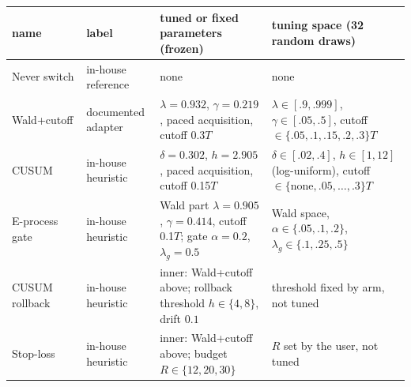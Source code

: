 \begin{tabular}{@{}>{\raggedright\arraybackslash}p{2.3cm}>{\raggedright\arraybackslash}p{3.2cm}>{\raggedright\arraybackslash}p{5.6cm}>{\raggedright\arraybackslash}p{4.0cm}@{}}
\toprule
name & label & tuned or fixed parameters (frozen) & tuning space (32 random draws)\\
\midrule
Never switch & in-house reference & none & none \\
Wald+cutoff & documented adapter & $\lambda=0.932$, $\gamma=0.219$, paced acquisition, cutoff 0.3$T$ & $\lambda\in[.9,.999]$, $\gamma\in[.05,.5]$, cutoff $\in\{.05,.1,.15,.2,.3\}T$ \\
CUSUM & in-house heuristic & $\delta=0.302$, $h=2.905$, paced acquisition, cutoff 0.15$T$ & $\delta\in[.02,.4]$, $h\in[1,12]$ (log-uniform), cutoff $\in\{\text{none},.05,\dots,.3\}T$ \\
E-process gate & in-house heuristic & Wald part $\lambda=0.905$, $\gamma=0.414$, cutoff 0.1$T$; gate $\alpha=0.2$, $\lambda_g=0.5$ & Wald space, $\alpha\in\{.05,.1,.2\}$, $\lambda_g\in\{.1,.25,.5\}$ \\
CUSUM rollback & in-house heuristic & inner: Wald+cutoff above; rollback threshold $h\in\{4,8\}$, drift $0.1$ & threshold fixed by arm, not tuned \\
Stop-loss & in-house heuristic & inner: Wald+cutoff above; budget $R\in\{12,20,30\}$ & $R$ set by the user, not tuned \\
\bottomrule
\end{tabular}

